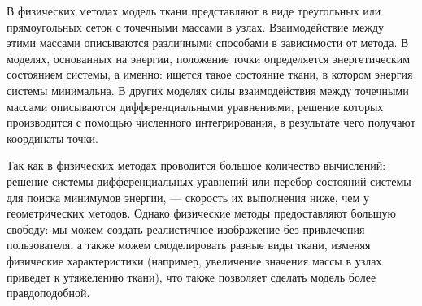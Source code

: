 В физических методах модель ткани представляют в виде  треугольных или
прямоугольных сеток с точечными массами в узлах. Взаимодействие между этими
массами  описываются различными способами в зависимости от метода. В моделях,
основанных на энергии, положение точки определяется энергетическим состоянием
системы, а именно: ищется такое состояние ткани, в котором энергия системы
минимальна. В других моделях силы взаимодействия между точечными массами
описываются дифференциальными уравнениями, решение которых производится с
помощью численного интегрирования, в результате чего получают координаты точки.
\cite{bib07}

Так как в физических методах проводится большое количество вычислений: решение
системы дифференциальных уравнений или перебор состояний системы для поиска
минимумов энергии, --- скорость их выполнения ниже, чем у геометрических
методов. Однако физические методы предоставляют большую свободу: мы можем
создать реалистичное изображение без привлечения пользователя, а также можем
смоделировать разные виды ткани, изменяя физические характеристики (например,
увеличение значения массы в узлах приведет к утяжелению ткани), что также
позволяет сделать модель более правдоподобной. \cite{bib07}

